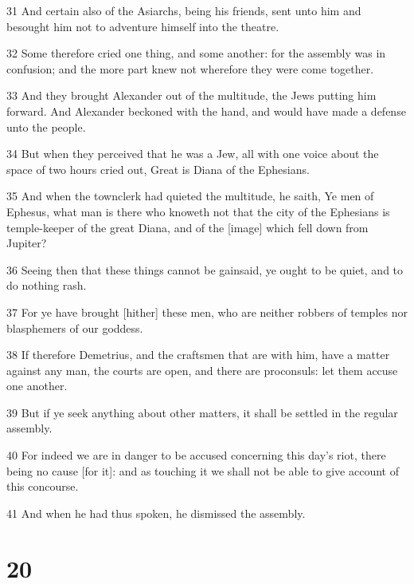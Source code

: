 \par 31 And certain also of the Asiarchs, being his friends, sent unto him and besought him not to adventure himself into the theatre.
\par 32 Some therefore cried one thing, and some another: for the assembly was in confusion; and the more part knew not wherefore they were come together.
\par 33 And they brought Alexander out of the multitude, the Jews putting him forward. And Alexander beckoned with the hand, and would have made a defense unto the people.
\par 34 But when they perceived that he was a Jew, all with one voice about the space of two hours cried out, Great is Diana of the Ephesians.
\par 35 And when the townclerk had quieted the multitude, he saith, Ye men of Ephesus, what man is there who knoweth not that the city of the Ephesians is temple-keeper of the great Diana, and of the [image] which fell down from Jupiter?
\par 36 Seeing then that these things cannot be gainsaid, ye ought to be quiet, and to do nothing rash.
\par 37 For ye have brought [hither] these men, who are neither robbers of temples nor blasphemers of our goddess.
\par 38 If therefore Demetrius, and the craftsmen that are with him, have a matter against any man, the courts are open, and there are proconsuls: let them accuse one another.
\par 39 But if ye seek anything about other matters, it shall be settled in the regular assembly.
\par 40 For indeed we are in danger to be accused concerning this day's riot, there being no cause [for it]: and as touching it we shall not be able to give account of this concourse.
\par 41 And when he had thus spoken, he dismissed the assembly.

\chapter{20}

